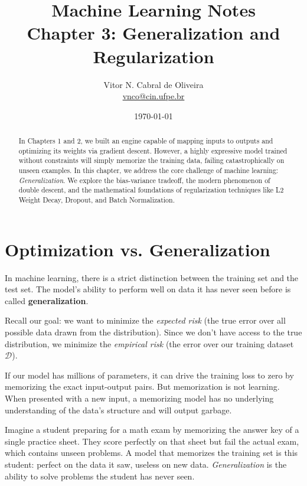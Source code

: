 \documentclass{tufte-handout}
\title{Machine Learning Notes \\ Chapter 3: Generalization and Regularization}
\author{Vitor N. Cabral de Oliveira\\ \href{mailto:vnco@cin.ufpe.br}{vnco@cin.ufpe.br}}
\date{\today}
\begin{document}
\maketitle
\begin{abstract}
    In Chapters 1 and 2, we built an engine capable of mapping inputs to outputs and optimizing its weights via gradient descent. However, a highly expressive model trained without constraints will simply memorize the training data, failing catastrophically on unseen examples. In this chapter, we address the core challenge of machine learning: \textit{Generalization}. We explore the bias-variance tradeoff, the modern phenomenon of double descent, and the mathematical foundations of regularization techniques like L2 Weight Decay, Dropout, and Batch Normalization.
\end{abstract}

\newpage
\hypersetup{linkcolor=wp-text}
\tableofcontents
\hypersetup{linkcolor=wp-primary}
\newpage

\section{Optimization vs. Generalization}

In machine learning, there is a strict distinction between the training set and the test set. The model's ability to perform well on data it has never seen before is called \textbf{generalization}.

Recall our goal: we want to minimize the \textit{expected risk} (the true error over all possible data drawn from the distribution). Since we don't have access to the true distribution, we minimize the \textit{empirical risk} (the error over our training dataset $\mathcal{D}$). 

If our model has millions of parameters, it can drive the training loss to zero by memorizing the exact input-output pairs. But memorization is not learning. When presented with a new input, a memorizing model has no underlying understanding of the data's structure and will output garbage.

\begin{marginfigure}[-2.0cm]
\centering
\begin{tcolorbox}[colback=wp-light, colframe=wp-accent, title=\textbf{Intuition: The Cramming Student}]
Imagine a student preparing for a math exam by memorizing the answer key of a single practice sheet. They score perfectly on that sheet but fail the actual exam, which contains unseen problems. A model that memorizes the training set is this student: perfect on the data it saw, useless on new data. \textit{Generalization} is the ability to solve problems the student has never seen.
\end{tcolorbox}
\end{marginfigure}
\end{document}
